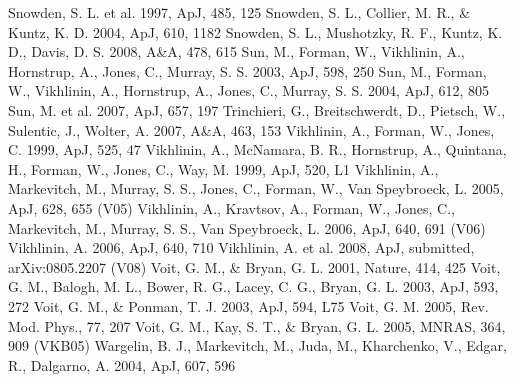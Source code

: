 \documentclass{aastex}
\begin{document}
\begin{references}
  Snowden, S. L. et al. 1997, ApJ, 485, 125	
  Snowden, S. L., Collier, M. R., \& Kuntz, K. D. 2004, ApJ, 610, 1182
  Snowden, S. L., Mushotzky, R. F., Kuntz, K. D., Davis, D. S. 2008, A\&A, 478, 615
  Sun, M., Forman, W., Vikhlinin, A., Hornstrup, A., Jones, C., Murray, S. S. 2003, ApJ, 598, 250
  Sun, M., Forman, W., Vikhlinin, A., Hornstrup, A., Jones, C., Murray, S. S. 2004, ApJ, 612, 805
  Sun, M. et al. 2007, ApJ, 657, 197
  Trinchieri, G., Breitschwerdt, D., Pietsch, W., Sulentic, J., Wolter, A. 2007, A\&A, 463, 153
  Vikhlinin, A., Forman, W., Jones, C. 1999, ApJ, 525, 47
  Vikhlinin, A., McNamara, B. R., Hornstrup, A., Quintana, H., Forman, W., Jones, C., Way, M. 1999, ApJ, 520, L1
  Vikhlinin, A., Markevitch, M., Murray, S. S., Jones, C., Forman, W., Van Speybroeck, L. 2005, ApJ, 628, 655 (V05)
  Vikhlinin, A., Kravtsov, A., Forman, W., Jones, C., Markevitch, M., Murray, S. S., Van Speybroeck, L. 2006, ApJ, 640, 691 (V06)
  Vikhlinin, A. 2006, ApJ, 640, 710
  Vikhlinin, A. et al. 2008, ApJ, submitted, arXiv:0805.2207 (V08)
  Voit, G. M., \& Bryan, G. L. 2001, Nature, 414, 425
  Voit, G. M., Balogh, M. L., Bower, R. G., Lacey, C. G., Bryan, G. L. 2003, ApJ, 593, 272
  Voit, G. M., \& Ponman, T. J. 2003, ApJ, 594, L75
  Voit, G. M. 2005, Rev. Mod. Phys., 77, 207
  Voit, G. M., Kay, S. T., \& Bryan, G. L. 2005, MNRAS, 364, 909 (VKB05)
  Wargelin, B. J., Markevitch, M., Juda, M., Kharchenko, V., Edgar, R., Dalgarno, A. 2004, ApJ, 607, 596	

\end{references}

\clearpage
\end{document}
